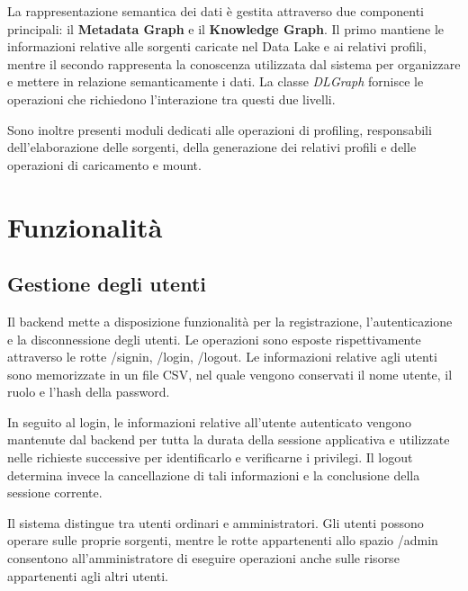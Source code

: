 \documentclass[13.6pt,a4paper]{report}
\begin{document}
\noindent
La rappresentazione semantica dei dati è gestita attraverso due componenti principali: il \textbf{Metadata Graph} e il \textbf{Knowledge Graph}. Il primo mantiene le informazioni relative alle sorgenti caricate nel Data Lake e ai relativi profili, mentre il secondo rappresenta la conoscenza utilizzata dal sistema per organizzare e mettere in relazione semanticamente i dati. La classe \textit{DLGraph} fornisce le operazioni che richiedono l'interazione tra questi due livelli.

\noindent
Sono inoltre presenti moduli dedicati alle operazioni di profiling, responsabili dell'elaborazione delle sorgenti, della generazione dei relativi profili e delle operazioni di caricamento e mount.




\section{Funzionalità}

\subsection{Gestione degli utenti}

Il backend mette a disposizione funzionalità per la registrazione, l'autenticazione e la disconnessione degli utenti. Le operazioni sono esposte rispettivamente attraverso le rotte \colorbox{gray!15}{/signin}, \colorbox{gray!15}{/login}, \colorbox{gray!15}{/logout}. Le informazioni relative agli utenti sono memorizzate in un file CSV, nel quale vengono conservati il nome utente, il ruolo e l'hash della password.

\noindent
In seguito al login, le informazioni relative all'utente autenticato vengono mantenute dal backend per tutta la durata della sessione applicativa e utilizzate nelle richieste successive per identificarlo e verificarne i privilegi. Il logout determina invece la cancellazione di tali informazioni e la conclusione della sessione corrente.

\noindent
Il sistema distingue tra utenti ordinari e amministratori. Gli utenti possono operare sulle proprie sorgenti, mentre le rotte appartenenti allo spazio \colorbox{gray!15}{/admin} consentono all'amministratore di eseguire operazioni anche sulle risorse appartenenti agli altri utenti.
\end{document}

